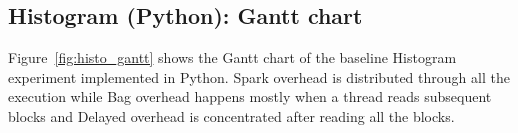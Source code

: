 \documentclass[conference]{IEEEtran}
\begin{document}
\subsection{Histogram (Python): Gantt chart}
Figure~\ref{fig:histo_gantt} shows the Gantt chart of the baseline
Histogram experiment implemented in Python. Spark overhead is distributed
through all the execution while Bag overhead happens mostly when a thread
reads subsequent blocks and Delayed overhead is concentrated after reading
all the blocks.

\end{document}
